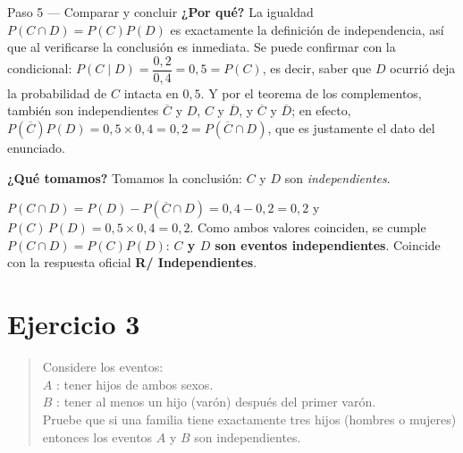 \documentclass[11pt]{article}
\begin{document}
\begin{sol}
\begin{paso}{Paso 5 --- Comparar y concluir}
\textbf{¿Por qué?} La igualdad $P(C\cap D)=P(C)P(D)$ es exactamente la definición de
independencia, así que al verificarse la conclusión es inmediata. Se puede confirmar con la
condicional: $P(C\mid D)=\dfrac{0{,}2}{0{,}4}=0{,}5=P(C)$, es decir, saber que $D$ ocurrió
deja la probabilidad de $C$ intacta en $0{,}5$. Y por el teorema de los complementos, también
son independientes $\overline{C}$ y $D$, $C$ y $\overline{D}$, y $\overline{C}$ y
$\overline{D}$; en efecto,
$P(\overline{C})P(D)=0{,}5\times0{,}4=0{,}2=P(\overline{C}\cap D)$, que es justamente el dato
del enunciado.

\textbf{¿Qué tomamos?} Tomamos la conclusión: $C$ y $D$ son \emph{independientes}.
\end{paso}
\end{sol}

\begin{resp}
$P(C\cap D)=P(D)-P(\overline{C}\cap D)=0{,}4-0{,}2=0{,}2$ y
$P(C)\,P(D)=0{,}5\times0{,}4=0{,}2$. Como ambos valores coinciden, se cumple
$P(C\cap D)=P(C)P(D)$: \textbf{$C$ y $D$ son eventos independientes}.
Coincide con la respuesta oficial \textbf{R/ Independientes}.
\end{resp}

\section*{Ejercicio 3}

\begin{quote}
Considere los eventos:\\[4pt]
$A$ : tener hijos de ambos sexos.\\
$B$ : tener al menos un hijo (varón) después del primer varón.\\[4pt]
Pruebe que si una familia tiene exactamente tres hijos (hombres o mujeres) entonces los eventos $A$ y $B$ son independientes.
\end{quote}
\end{document}
